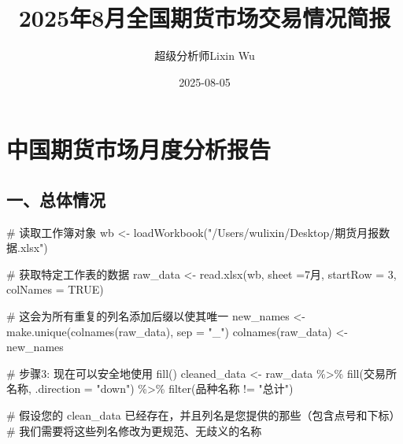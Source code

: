 \documentclass[
  letterpaper,
  DIV=11,
  numbers=noendperiod]{scrartcl}
\title{2025年8月全国期货市场交易情况简报}
\author{超级分析师Lixin Wu}
\date{2025-08-05}
\newenvironment{Shaded}{\begin{snugshade}}{\end{snugshade}}
\newcommand{\AttributeTok}[1]{\textcolor[rgb]{0.40,0.45,0.13}{#1}}
\newcommand{\CommentTok}[1]{\textcolor[rgb]{0.37,0.37,0.37}{#1}}
\newcommand{\ConstantTok}[1]{\textcolor[rgb]{0.56,0.35,0.01}{#1}}
\newcommand{\DecValTok}[1]{\textcolor[rgb]{0.68,0.00,0.00}{#1}}
\newcommand{\FunctionTok}[1]{\textcolor[rgb]{0.28,0.35,0.67}{#1}}
\newcommand{\NormalTok}[1]{\textcolor[rgb]{0.00,0.23,0.31}{#1}}
\newcommand{\OtherTok}[1]{\textcolor[rgb]{0.00,0.23,0.31}{#1}}
\newcommand{\SpecialCharTok}[1]{\textcolor[rgb]{0.37,0.37,0.37}{#1}}
\newcommand{\StringTok}[1]{\textcolor[rgb]{0.13,0.47,0.30}{#1}}
\begin{document}
\maketitle


\section{中国期货市场月度分析报告}\label{ux4e2dux56fdux671fux8d27ux5e02ux573aux6708ux5ea6ux5206ux6790ux62a5ux544a}

\subsection{一、总体情况}\label{ux4e00ux603bux4f53ux60c5ux51b5}

\begin{Shaded}
\begin{Highlighting}[]
\CommentTok{\# 读取工作簿对象}
\NormalTok{wb }\OtherTok{\textless{}{-}} \FunctionTok{loadWorkbook}\NormalTok{(}\StringTok{"/Users/wulixin/Desktop/期货月报数据.xlsx"}\NormalTok{)}

\CommentTok{\# 获取特定工作表的数据}
\NormalTok{raw\_data }\OtherTok{\textless{}{-}} \FunctionTok{read.xlsx}\NormalTok{(wb, }\AttributeTok{sheet =}\StringTok{\textquotesingle{}7月\textquotesingle{}}\NormalTok{, }\AttributeTok{startRow =} \DecValTok{3}\NormalTok{, }\AttributeTok{colNames =} \ConstantTok{TRUE}\NormalTok{)}

\CommentTok{\# 这会为所有重复的列名添加后缀以使其唯一}
\NormalTok{new\_names }\OtherTok{\textless{}{-}} \FunctionTok{make.unique}\NormalTok{(}\FunctionTok{colnames}\NormalTok{(raw\_data), }\AttributeTok{sep =} \StringTok{"\_"}\NormalTok{)}
\FunctionTok{colnames}\NormalTok{(raw\_data) }\OtherTok{\textless{}{-}}\NormalTok{ new\_names}

\CommentTok{\# 步骤3: 现在可以安全地使用 fill()}
\NormalTok{cleaned\_data }\OtherTok{\textless{}{-}}\NormalTok{ raw\_data }\SpecialCharTok{\%\textgreater{}\%}
  \FunctionTok{fill}\NormalTok{(交易所名称, }\AttributeTok{.direction =} \StringTok{"down"}\NormalTok{) }\SpecialCharTok{\%\textgreater{}\%}
  \FunctionTok{filter}\NormalTok{(品种名称 }\SpecialCharTok{!=} \StringTok{"总计"}\NormalTok{)}

\CommentTok{\# 假设您的 clean\_data 已经存在，并且列名是您提供的那些（包含点号和下标）}
\CommentTok{\# 我们需要将这些列名修改为更规范、无歧义的名称}


\end{Highlighting}
\end{Shaded}
\end{document}
